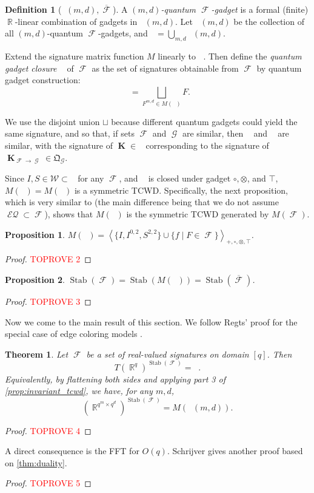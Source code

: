\documentclass{article}
\newtheorem{theorem}{Theorem}[section]
\newtheorem{proposition}{Proposition}[section]
\theoremstyle{remark}
\theoremstyle{definition}
\newtheorem{definition}{Definition}[section]
\DeclareMathOperator{\rr}{\mathbb{R}}
\DeclareMathOperator{\vk}{\mathbf{K}}
\DeclareMathOperator{\fc}{\mathcal{F}}
\DeclareMathOperator{\gc}{\mathcal{G}}
\DeclareMathOperator{\gk}{\mathfrak{G}_{\mathcal{F}}}
\DeclareMathOperator{\qk}{\mathfrak{Q}_{\mathcal{F}}}
\DeclareMathOperator{\ofc}{\overline{\fc}}
\DeclareMathOperator{\ogc}{\overline{\gc}}
\DeclareMathOperator{\stab}{Stab}
\newcommand{\tcwd}[1]{\left\langle #1 \right\rangle_{+, \circ, \otimes ,\top}}
\DeclareMathOperator{\eq}{\mathcal{EQ}}
\begin{document}
\begin{definition}[$\qk(m,d), \overline{\fc}$]
    \label{def:quantum_gadget}
    A \emph{$(m,d)$-quantum $\fc$-gadget} is a formal (finite) $\rr$-linear combination of gadgets in
    $\gk(m,d)$. Let $\qk(m,d)$ be the collection of all $(m,d)$-quantum $\fc$-gadgets,
    and $\qk = \bigcup_{m,d}\qk(m,d)$.

    Extend the signature matrix function $M$ linearly to $\qk$. Then define the \emph{quantum gadget
    closure} $\ofc$ of $\fc$ as the
    set of signatures obtainable from $\fc$ by quantum gadget construction:
    \[
        \ofc = \bigsqcup_{F^{m,d} \in M(\qk)}F.
    \]
\end{definition}
We use the disjoint union $\sqcup$ because different quantum gadgets could yield the same
signature, and so that, if sets $\fc$ and $\gc$ are similar, then $\ofc$ and
$\ogc$ are similar, with the signature of $\vk \in \qk$ corresponding to the signature of
$\vk_{\fc\to\gc} \in \mathfrak{Q}_{\gc}$.

Since $I,S \in \mathcal{W} \subset \ofc$ for any $\fc$, and $\gk$ is closed under gadget 
$\circ,\otimes$, and $\top$, $M(\qk) = M(\ofc)$ is a symmetric TCWD. Specifically,
the next proposition, which is very similar to \cite[Theorem 3]{young2022equality} (the main difference 
being that we do not assume $\eq \subset \fc$), shows that $M(\qk)$ is the symmetric TCWD generated by $M(\fc)$.
\begin{proposition}
    $M(\qk) = \tcwd{\big\{I,I^{0,2},S^{2,2}\big\} \cup \big\{f \mid F \in \fc\big\}}$.
    \label{prop:mqf}
\end{proposition}
\begin{proof}\textcolor{red}{TOPROVE 2}\end{proof}

\begin{proposition}
    \label{prop:stabfc}
    $\stab(\fc) = \stab(M(\qk)) = \stab(\overline{\fc})$.
\end{proposition}
\begin{proof}\textcolor{red}{TOPROVE 3}\end{proof}

Now we come to the main result of this section. We follow Regts' proof
for the special case of edge coloring models \cite[Theorem 6.8]{regts}.
\begin{theorem}
    \label{thm:intertwiner_gadget}
    Let $\fc$ be a set of real-valued signatures on domain $[q]$. Then
    \[
        T(\rr^q)^{\stab(\fc)} = \ofc.
    \]
    Equivalently, by flattening both sides and applying part 3 of \autoref{prop:invariant_tcwd},
    we have, for any $m,d$,
    \[
        \left(\rr^{q^m\times q^d}\right)^{\stab(\fc)} = M(\qk(m,d)).
    \]
\end{theorem}
\begin{proof}\textcolor{red}{TOPROVE 4}\end{proof}
A direct consequence is the FFT for $O(q)$. Schrijver \cite{schrijver_tensor_2008} gives another 
proof based on \autoref{thm:duality}.
\begin{proof}\textcolor{red}{TOPROVE 5}\end{proof}
\end{document}
